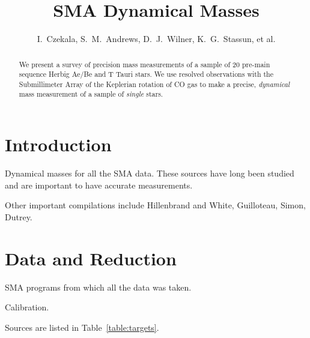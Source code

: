 \documentclass[iop,floatfix,numberedappendix,twocolappendix]{emulateapj}
\begin{document}
\title{SMA Dynamical Masses}
\author{I.~Czekala, S.~M.~Andrews, D.~J.~Wilner, K.~G.~Stassun, et al.}


\begin{abstract}
We present a survey of precision mass measurements of a sample of 20 pre-main sequence Herbig Ae/Be and T Tauri stars. We use resolved observations with the Submillimeter Array of the Keplerian rotation of CO gas to make a precise, \emph{dynamical} mass measurement of a sample of \emph{single} stars.
\end{abstract}


\section{Introduction}

Dynamical masses for all the SMA data. These sources have long been studied and are important to have accurate measurements.

Other important compilations include Hillenbrand and White, Guilloteau, Simon, Dutrey.

\section{Data and Reduction}

SMA programs from which all the data was taken.

Calibration.

Sources are listed in Table~\ref{table:targets}.
\end{document}
